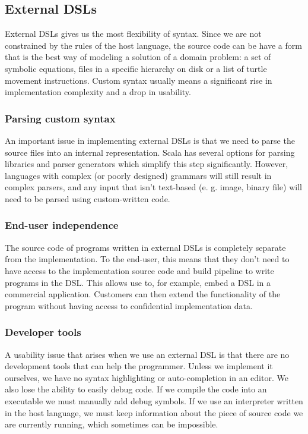 \subsection{External DSLs}

External DSLs gives us the most flexibility of syntax. Since we are not constrained by the rules of the host language, the source code can be have a form that is the best way of modeling a solution of a domain problem: a set of symbolic equations, files in a specific hierarchy on disk or a list of turtle movement instructions. Custom syntax usually means a significant rise in implementation complexity and a drop in usability. 

\subsubsection{Parsing custom syntax}

An important issue in implementing external DSLs is that we need to parse the source files into an internal representation. Scala has several options for parsing libraries and parser generators which simplify this step significantly. However, languages with complex (or poorly designed) grammars will still result in complex parsers, and any input that isn't text-based (e. g. image, binary file) will need to be parsed using custom-written code.

\subsubsection{End-user independence}

The source code of programs written in external DSLs is completely separate from the implementation. To the end-user, this means that they don't need to have access to the implementation source code and build pipeline to write programs in the DSL. This allows use to, for example, embed a DSL in a commercial application. Customers can then extend the functionality of the program without having access to confidential implementation data.

\subsubsection{Developer tools}

A usability issue that arises when we use an external DSL is that there are no development tools that can help the programmer. Unless we implement it ourselves, we have no syntax highlighting or auto-completion in an editor. We also lose the ability to easily debug code. If we compile the code into an executable we must manually add debug symbols. If we use an interpreter written in the host language, we must keep information about the piece of source code we are currently running, which sometimes can be impossible.

